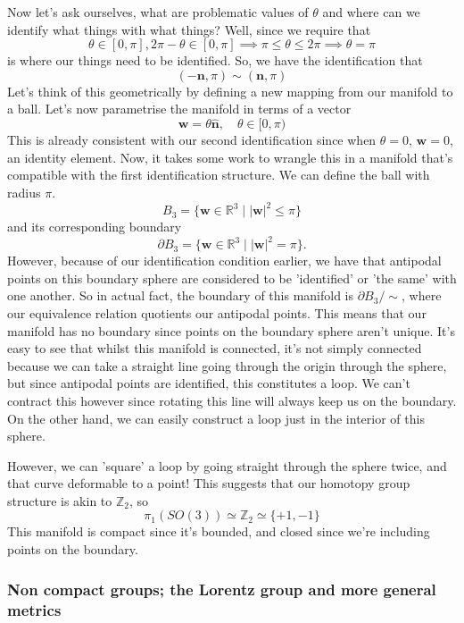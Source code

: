 \documentclass[11pt, oneside]{article}   	%
\theoremstyle{slanted}
\begin{document}
Now let's ask ourselves, what are problematic values of $\theta$ and where can we identify what things with what things? Well, since we require that 
\[ 
	\theta \in [0,\pi ], 2 \pi  -\theta \in [ 0, \pi ] \implies \pi \leq \theta \leq 2 \pi \implies \theta = \pi 
\] is where our things need to be identified. So, we have the identification that 
\[ 
	( - \mathbf{n}, \pi) \sim (\mathbf{n}, \pi )
\]  
Let's think of this geometrically by defining a new mapping from our manifold to a ball. Let's now parametrise the manifold in terms of a vector 
\[ 
 	\mathbf{w} = \theta \hat{ \mathbf{ n} }, \quad \theta \in [0, \pi ) 
\] This is already consistent with our second identification since when  $\theta = 0$, $\mathbf{ w}  = 0 $, an identity element. Now, it takes some work to wrangle this in a manifold that's compatible with the first identification structure. 
We can define the ball with radius $ \pi$. 
\[
	B_3  = \{\mathbf{w} \in \mathbb{R}^3 \mid |\mathbf{w}|^2 \leq \pi  \} 
\]
and its corresponding boundary 
\[
	\partial B_3 = \{\mathbf{w} \in \mathbb{R}^3 \mid |\mathbf{w}|^2 =\pi  \}. 
\] However, because of our identification condition earlier, we have that antipodal points on this boundary sphere are considered to be 'identified' or 'the same' with one another. So in actual fact, the boundary of this manifold is $\partial B_3  / \sim$, where our equivalence relation quotients our antipodal points. This means that our manifold has no boundary since points on the boundary sphere aren't unique. It's easy to see that whilst this manifold is connected, it's not simply connected because we can take a straight line going through the origin through the sphere, but since antipodal points are identified, this constitutes a loop. We can't contract this however since rotating this line will always keep us on the boundary. On the other hand, we can easily construct a loop just in the interior of this sphere. 

However, we can 'square' a loop by going straight through the sphere twice, and that curve  deformable to a point! This suggests that our homotopy group structure is akin to $\mathbb{Z}_2$, so 
\[ 
	\pi_1 ( SO ( 3) ) \simeq \mathbb{Z}_ 2 \simeq \{ +1, - 1 \} 
\] 
This manifold is compact since it's bounded, and closed since we're including points on the boundary. 

\pagebreak 
\subsubsection{Non compact groups; the Lorentz group and more general metrics}
\end{document}
